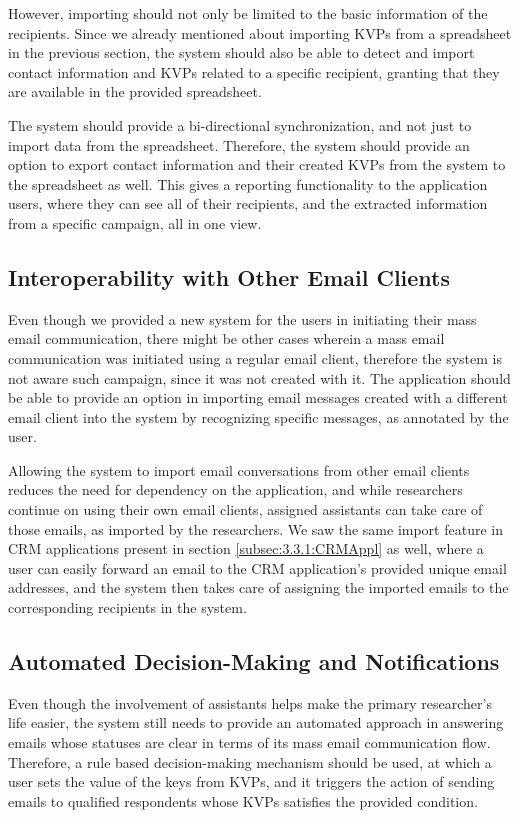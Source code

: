 However, importing should not only be limited to the basic information of the recipients. Since we already mentioned about importing \ac{KVP}s from a spreadsheet in the previous section, the system should also be able to detect and import contact information and \ac{KVP}s related to a specific recipient, granting that they are available in the provided spreadsheet. 
\vspace{1cm}

The system should provide a bi-directional synchronization, and not just to import data from the spreadsheet. Therefore, the system should provide an option to export contact information and their created \ac{KVP}s from the system to the spreadsheet as well. This gives a reporting functionality to the application users, where they can see all of their recipients, and the extracted information from a specific campaign, all in one view.

\subsection{Interoperability with Other Email Clients}
\label{subsec:5.1.4:InteEmaiClie}
Even though we provided a new system for the users in initiating their mass email communication, there might be other cases wherein a mass email communication was initiated using a regular email client, therefore the system is not aware such campaign, since it was not created with it. The application should be able to provide an option in importing email messages created with a different email client into the system by recognizing specific messages, as annotated by the user.
\vspace{1cm}

Allowing the system to import email conversations from other email clients reduces the need for dependency on the application, and while researchers continue on using their own email clients, assigned assistants can take care of those emails, as imported by the researchers. We saw the same import feature in \ac{CRM} applications present in section \ref{subsec:3.3.1:CRMAppl} as well, where a user can easily forward an email to the \ac{CRM} application's provided unique email addresses, and the system then takes care of assigning the imported emails to the corresponding recipients in the system.

\subsection{Automated Decision-Making and Notifications}
\label{subsec:5.1.5:AutoDeciMakiNoti}
Even though the involvement of assistants helps make the primary researcher's life easier, the system still needs to provide an automated approach in answering emails whose statuses are clear in terms of its mass email communication flow. Therefore, a rule based decision-making mechanism should be used, at which a user sets the value of the keys from \ac{KVP}s, and it triggers the action of sending emails to qualified respondents whose \ac{KVP}s satisfies the provided condition.
\vspace{1cm}


